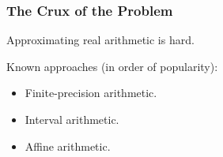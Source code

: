 \begin{frame}

\frametitle{The Crux of the Problem}

\vspace{\fill}

\begin{center}

Approximating real arithmetic is hard.

\end{center}

\vspace{\fill}

Known approaches (in order of popularity):

\begin{itemize}

\item Finite-precision arithmetic.

\item Interval arithmetic.

\item Affine arithmetic.

\end{itemize}

\end{frame}
